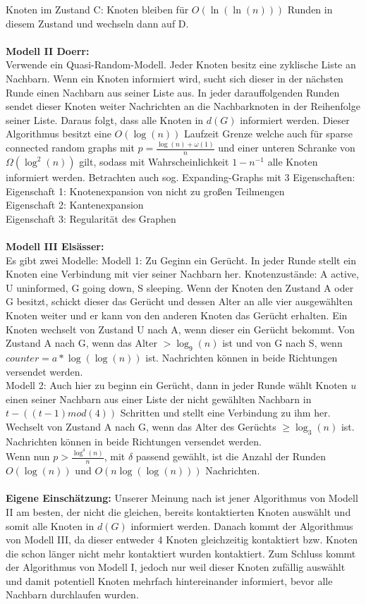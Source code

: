 \documentclass[12pt,a4paper]{report}
\begin{document}
Knoten im Zustand C: Knoten bleiben für $O(\ln(\ln(n)))$ Runden in diesem Zustand und wechseln dann auf D.
\\
\\
\textbf{Modell II Doerr:}\\
Verwende ein Quasi-Random-Modell. Jeder Knoten besitz eine zyklische Liste an Nachbarn. Wenn ein Knoten informiert wird, sucht sich dieser in der nächsten Runde einen Nachbarn aus seiner Liste aus. In jeder darauffolgenden Runden sendet dieser Knoten weiter Nachrichten an die Nachbarknoten in der Reihenfolge seiner Liste. Daraus folgt, dass alle Knoten in $d(G)$ informiert werden. Dieser Algorithmus besitzt eine $O(\log(n))$ Laufzeit Grenze welche auch für sparse connected random graphs mit $p=\frac{\log(n)+\omega(1)}{n}$ und einer unteren Schranke von $\Omega(\log^2(n))$ gilt, sodass mit Wahrscheinlichkeit $1-n^{-1}$ alle Knoten informiert werden. Betrachten auch sog. Expanding-Graphs mit 3 Eigenschaften:\\
Eigenschaft 1: Knotenexpansion von nicht zu großen Teilmengen\\
Eigenschaft 2: Kantenexpansion\\
Eigenschaft 3: Regularität des Graphen
\\
\\
\textbf{Modell III Elsässer:}\\
Es gibt zwei Modelle: Modell 1: Zu Geginn ein Gerücht. In jeder Runde stellt ein Knoten eine Verbindung mit vier seiner Nachbarn her. Knotenzustände: A active, U uninformed, G going down, S sleeping. Wenn der Knoten den Zustand A oder G besitzt, schickt dieser das Gerücht und dessen Alter an alle vier ausgewählten Knoten weiter und er kann von den anderen Knoten das Gerücht erhalten. Ein Knoten wechselt von Zustand U nach A, wenn dieser ein Gerücht bekommt.
Von Zustand A nach G, wenn das Alter $>\log_9(n)$ ist und von G nach S, wenn $counter = a*\log(\log(n))$ ist. Nachrichten können in beide Richtungen versendet werden.\\
Modell 2: Auch hier zu beginn ein Gerücht, dann in jeder Runde wählt Knoten $u$ einen seiner Nachbarn aus einer Liste der nicht gewählten Nachbarn in $t-((t-1)mod(4))$ Schritten und stellt eine Verbindung zu ihm her. Wechselt von Zustand A nach G, wenn das Alter des Gerüchts $\ge \log_3(n)$ ist. Nachrichten können in beide Richtungen versendet werden.\\
Wenn nun $p>\frac{\log^{\delta}(n)}{n}$, mit $\delta$ passend gewählt, ist die Anzahl der Runden $O(\log(n))$ und $O(n\log(\log(n)))$ Nachrichten.
\\
\\
\textbf{Eigene Einschätzung:} Unserer Meinung nach ist jener Algorithmus von Modell II am besten, der nicht die gleichen, bereits kontaktierten Knoten auswählt und somit alle Knoten in $d(G)$ informiert werden. Danach kommt der Algorithmus von Modell III, da dieser entweder 4 Knoten gleichzeitig kontaktiert bzw. Knoten die schon länger nicht mehr kontaktiert wurden kontaktiert. Zum Schluss kommt der Algorithmus von Modell I, jedoch nur weil dieser Knoten zufällig auswählt und damit potentiell Knoten mehrfach hintereinander informiert, bevor alle Nachbarn durchlaufen wurden.
\end{document}
